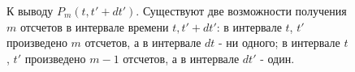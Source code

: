 \begin{figure}
\centering



\caption{К выводу $P_m\left(t, t' + dt'\right)$. Существуют две
  возможности получения $m$ отсчетов в интервале времени $t, t' +
  dt'$: в интервале $t$, $t'$ произведено $m$ отсчетов, а в интервале
  $dt$ - ни одного; в интервале $t$, $t'$ произведено  $m - 1$
  отсчетов, а в интервале $dt'$ - один.}
\label{figPart4Ch2_5}
\end{figure}
